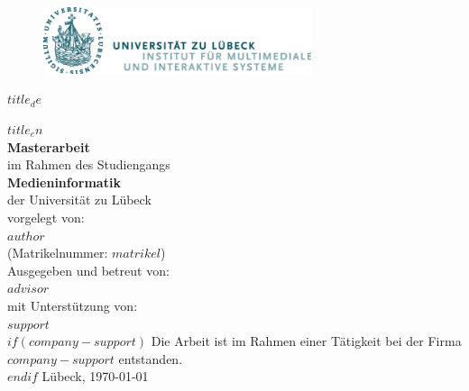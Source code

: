 
\newcommand{\titelMA}{$title_de$}
\newcommand{\titelMAEnglish}{$title_en$}

\newcommand{\authorMA}{$author$}

\newcommand{\examinerMA}{$advisor$}

\newcommand{\supporterMA}{$support$}


\begin{titlepage}
    \begin{figure}[t]
        \centering
        \includegraphics[width=0.7\textwidth]{img/UzL_Logo.png}
    \end{figure}

    \begin{center}
        \selectfont
        \vspace*{1.5cm}
        \Large
        \begin{onehalfspace}
            \textbf{\titelMA}
        \end{onehalfspace}
        \vspace{0.5cm}
        \titelMAEnglish\\
        \vspace{1cm}
        \normalsize
        \textbf{Masterarbeit}\\
        \vspace{0.2cm}
        im Rahmen des Studiengangs\\
        \textbf{Medieninformatik}\\
        der Universität zu Lübeck\\
        \vspace{1cm}
        vorgelegt von:\\ \textbf{\authorMA}\\
        (Matrikelnummer: $matrikel$) \\
        \vspace{1cm}
        Ausgegeben und betreut von:\\ \textbf{\examinerMA}\\
        \vspace{0.5cm}
        mit Unterstützung von:\\ \textbf{\supporterMA}\\
        $if(company-support)$
          \vspace{0.7cm}
          Die Arbeit ist im Rahmen einer Tätigkeit bei der Firma $company-support$ entstanden.\\
        $endif$
        \vspace{0.3cm}
        Lübeck, \today
    \end{center}        
\end{titlepage}